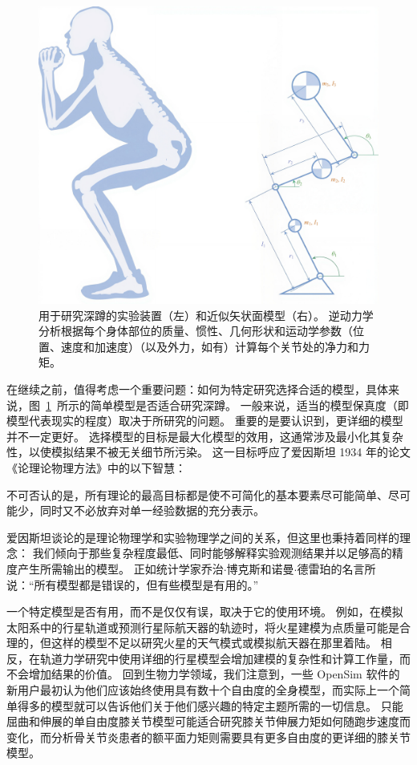 \begin{figure}[!htb]
	\centering
	\includegraphics[width=1.0\linewidth]{chap8/8_4}
	\caption{用于研究深蹲的实验装置（左）和近似矢状面模型（右）。
		逆动力学分析根据每个身体部位的质量、惯性、几何形状和运动学参数（位置、速度和加速度）（以及外力，如有）计算每个关节处的净力和力矩。 \label{fig:8_4}}
\end{figure}


在继续之前，值得考虑一个重要问题：如何为特定研究选择合适的模型，具体来说，图~\ref{fig:8_4}~所示的简单模型是否适合研究深蹲。
一般来说，适当的模型保真度（即模型代表现实的程度）取决于所研究的问题。
重要的是要认识到，更详细的模型并不一定更好。
选择模型的目标是最大化模型的效用，这通常涉及最小化其复杂性，以使模拟结果不被无关细节所污染。
这一目标呼应了爱因斯坦 1934 年的论文《论理论物理方法》中的以下智慧：


不可否认的是，所有理论的最高目标都是使不可简化的基本要素尽可能简单、尽可能少，同时又不必放弃对单一经验数据的充分表示。


爱因斯坦谈论的是理论物理学和实验物理学之间的关系，但这里也秉持着同样的理念：
我们倾向于那些复杂程度最低、同时能够解释实验观测结果并以足够高的精度产生所需输出的模型。
正如统计学家乔治$\cdot$博克斯和诺曼$\cdot$德雷珀的名言所说：“所有模型都是错误的，但有些模型是有用的。”


一个特定模型是否有用，而不是仅仅有误，取决于它的使用环境。
例如，在模拟太阳系中的行星轨道或预测行星际航天器的轨迹时，将火星建模为点质量可能是合理的，但这样的模型不足以研究火星的天气模式或模拟航天器在那里着陆。
相反，在轨道力学研究中使用详细的行星模型会增加建模的复杂性和计算工作量，而不会增加结果的价值。
回到生物力学领域，我们注意到，一些 OpenSim 软件的新用户最初认为他们应该始终使用具有数十个自由度的全身模型，而实际上一个简单得多的模型就可以告诉他们关于他们感兴趣的特定主题所需的一切信息。
只能屈曲和伸展的单自由度膝关节模型可能适合研究膝关节伸展力矩如何随跑步速度而变化，而分析骨关节炎患者的额平面力矩则需要具有更多自由度的更详细的膝关节模型。



